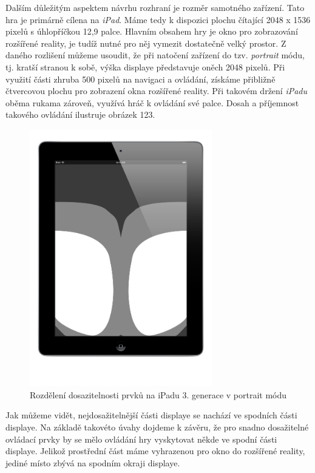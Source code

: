 \documentclass[twoside,12pt]{article}
\begin{document}
Dalším důležitým aspektem návrhu rozhraní je rozměr samotného zařízení. Tato hra je primárně cílena na \textit{iPad}. Máme tedy k dispozici plochu čítající 2048 x 1536 pixelů s úhlopříčkou 12,9 palce. Hlavním obsahem hry je okno pro zobrazování rozšířené reality, je tudíž nutné pro něj vymezit dostatečně velký prostor. Z daného rozlišení můžeme usoudit, že při natočení zařízení do tzv. \textit{portrait} módu, tj. kratší stranou k sobě, výška displaye představuje oněch 2048 pixelů. Při využití části zhruba 500 pixelů na navigaci a ovládání, získáme přibližně čtvercovou plochu pro zobrazení okna rozšířené reality. Při takovém držení \textit{iPadu} oběma rukama zároveň, využívá hráč k ovládání své palce. Dosah a příjemnost takového ovládání ilustruje obrázek 123.

\begin{figure}[H]
\centering
    \includegraphics[width=300px, center]{images/ipad-toucharea.png}
\captionsetup{justification=centering}
    \caption{Rozdělení dosazitelnosti prvků na iPadu 3. generace v portrait módu}
    \label{class_diagram}
\end{figure}


Jak můžeme vidět, nejdosažitelnější části displaye se nachází ve spodních části displaye. Na základě takovéto úvahy dojdeme k závěru, že pro snadno dosažitelné ovládací prvky by se mělo ovládání hry vyskytovat někde ve spodní části displaye. Jelikož prostřední část máme vyhrazenou pro okno do rozšířené reality, jediné místo zbývá na spodním okraji displaye. 
\end{document}
